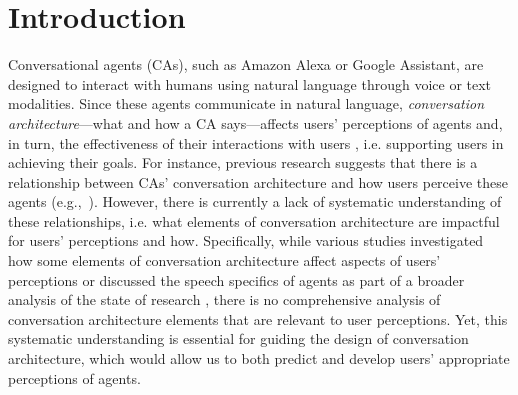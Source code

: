 
\section{Introduction}

Conversational agents (CAs), such as Amazon Alexa or Google Assistant, are designed to interact with humans using natural language through voice or text modalities. Since these agents communicate in natural language, \textit{conversation architecture}---what and how a CA says---affects users' perceptions of agents and, in turn, the effectiveness of their interactions with users \cite{knijnenburg2016inferring, seeger2021chatbots}, i.e. supporting users in achieving their goals. For instance, previous research suggests that there is a relationship between CAs' conversation architecture and how users perceive these agents %
(e.g.,~\cite{clark2019state, feine2019taxonomy, finch2020towards}).  However, there is currently a lack of systematic understanding of these relationships, i.e. what elements of conversation architecture are impactful for users' perceptions and how. Specifically, while various studies investigated how some elements of conversation architecture affect aspects of users' perceptions or discussed the speech specifics of agents as part of a broader analysis of the state of research \cite{clark2019state,feine2019taxonomy}, there is no comprehensive analysis of %
conversation architecture elements that are relevant to user perceptions. Yet, this systematic understanding is essential for guiding the design of conversation architecture, which would allow us to both predict and develop users' appropriate perceptions of agents.


